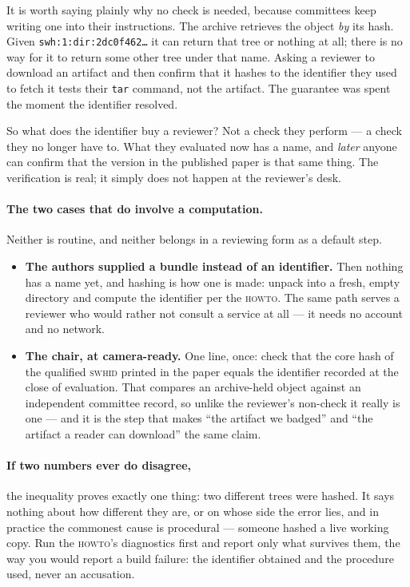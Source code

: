 It is worth saying plainly why no check is needed, because committees keep writing one into their
instructions. The archive retrieves the object \emph{by} its hash. Given
\texttt{swh:1:dir:2dc0f462\dots} it can return that tree or nothing at all; there is no way for it
to return some other tree under that name. Asking a reviewer to download an artifact and then
confirm that it hashes to the identifier they used to fetch it tests their \texttt{tar} command,
not the artifact. The guarantee was spent the moment the identifier resolved.

So what does the identifier buy a reviewer? Not a check they perform --- a check they no longer
have to. What they evaluated now has a name, and \emph{later} anyone can confirm that the version
in the published paper is that same thing. The verification is real; it simply does not happen at
the reviewer's desk.


\paragraph{The two cases that do involve a computation.} Neither is routine, and neither belongs
in a reviewing form as a default step.

\begin{itemize}[nosep,leftmargin=*]
  \item \textbf{The authors supplied a bundle instead of an identifier.} Then nothing has a name
        yet, and hashing is how one is made: unpack into a fresh, empty directory and compute the
        identifier per the \textsc{howto}. The same path serves a reviewer who would rather not
        consult a service at all --- it needs no account and no network.
  \item \textbf{The chair, at camera-ready.} One line, once: check that the core hash of the
        qualified \textsc{swhid} printed in the paper equals the identifier recorded at the close
        of evaluation. That compares an archive-held object against an independent committee
        record, so unlike the reviewer's non-check it really is one --- and it is the step that
        makes \enquote{the artifact we badged} and \enquote{the artifact a reader can download}
        the same claim.
\end{itemize}

\paragraph{If two numbers ever do disagree,} the inequality proves exactly one thing: two
different trees were hashed. It says nothing about how different they are, or on whose side the
error lies, and in practice the commonest cause is procedural --- someone hashed a live working
copy. Run the \textsc{howto}'s diagnostics first and report only what survives them, the way you
would report a build failure: the identifier obtained and the procedure used, never an accusation.

